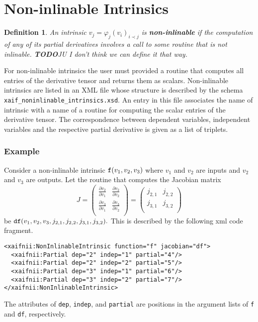 \documentclass{book}
\newcommand{\todo}{{\bf TODO}}
\newtheorem{Def}{Definition}
\begin{document}
\section{Non-inlinable Intrinsics}
\label{sec:NonInlinableIntrinsics}

\begin{Def} \label{def:noninlinable_intrinsic}
An intrinsic $v_j = \varphi_j(v_i)_{i \prec j}$ 
is {\bf non-inlinable} if the computation of any of its partial 
derivatives involves a call to some routine that is not inlinable.
\todo JU I don't think we can define it that way.
\end{Def}

For non-inlinable intrinsics
the user must provided a routine that computes all entries of
the derivative tensor and returns them as scalars. 
Non-inlinable intrinsics are listed in an XML file whose structure
is described by the schema {\tt xaif\_noninlinable\_intrinsics.xsd}.
An entry in this file associates the name of intrinsic with a name
of a routine for computing the scalar entries of the derivative tensor.
The correspondence between dependent variables, independent variables
and the respective partial derivative is given as a list of triplets.

\subsubsection{Example}

Consider a non-inlinable intrinsic ${\tt f}(v_1,v_2,v_3)$ 
where $v_1$ and $v_2$ are inputs and
$v_2$ and $v_3$ are outputs. Let the routine that
computes the Jacobian matrix
$$
J =
\begin{pmatrix}
\frac{\partial v_2}{\partial v_1} & \frac{\partial v_2}{\partial v_2} \\
\frac{\partial v_3}{\partial v_1} & \frac{\partial v_3}{\partial v_2} \\
\end{pmatrix} =
\begin{pmatrix}
j_{2,1} & j_{2,2} \\
j_{3,1} & j_{3,2} \\
\end{pmatrix} 
$$
be ${\tt df}(v_1,v_2,v_3,j_{2,1},j_{2,2},j_{3,1},j_{3,2}).$
This is described by the following xml code fragment.
\begin{verbatim}
<xaifnii:NonInlinableIntrinsic function="f" jacobian="df">
  <xaifnii:Partial dep="2" indep="1" partial="4"/>
  <xaifnii:Partial dep="2" indep="2" partial="5"/>
  <xaifnii:Partial dep="3" indep="1" partial="6"/>
  <xaifnii:Partial dep="3" indep="2" partial="7"/>
</xaifnii:NonInlinableIntrinsic>
\end{verbatim}
The attributes of {\tt dep}, {\tt indep}, and {\tt partial} are
positions in the argument lists of {\tt f} and {\tt df}, respectively.
\end{document}
